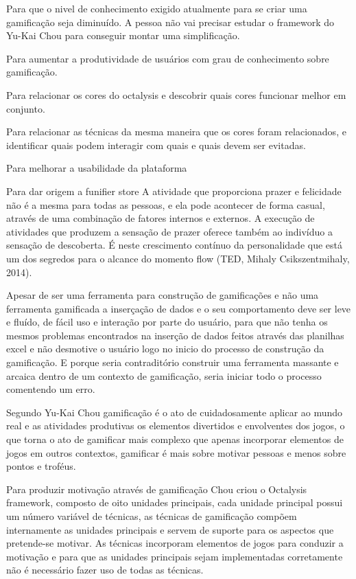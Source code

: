 Para que o nivel de conhecimento exigido atualmente para se criar uma gamificação seja diminuído. A pessoa não vai precisar estudar o framework do Yu-Kai Chou para conseguir montar uma simplificação.

Para aumentar a produtividade de usuários com grau de conhecimento sobre gamificação.

Para relacionar os cores do octalysis e descobrir quais cores funcionar melhor em conjunto.

Para relacionar as técnicas da mesma maneira que os cores foram relacionados, e identificar quais podem interagir com quais e quais devem ser evitadas.

Para melhorar a usabilidade da plataforma

Para dar origem a funifier store 
A atividade que proporciona prazer e felicidade não é a mesma para todas as pessoas, e ela pode acontecer de forma casual, através de uma combinação de fatores internos e externos. A execução de atividades que produzem a sensação de prazer oferece também ao indivíduo a sensação de descoberta. É neste crescimento contínuo da personalidade que está um dos segredos para o alcance do momento flow (TED, Mihaly Csikszentmihaly, 2014).

Apesar de ser uma ferramenta para construção de gamificações e não uma ferramenta gamificada a inserçação de dados e o seu comportamento deve ser leve e fluído, de fácil uso  e interação por parte do usuário, para que não tenha os mesmos problemas encontrados na inserção de dados feitos através das planilhas excel e não desmotive o usuário logo no inicio do processo de construção da gamificação. E porque seria contraditório construir uma ferramenta massante e arcaica dentro de um contexto de gamificação, seria iniciar todo o processo comentendo um erro.


Segundo Yu-Kai Chou \cite{arruda2007} gamificação é o ato de cuidadosamente aplicar ao mundo real e as atividades produtivas os elementos divertidos e envolventes dos jogos, o que torna o ato de gamificar mais complexo que apenas incorporar elementos de jogos em outros contextos, gamificar é mais sobre  motivar pessoas e menos sobre pontos e troféus. 

Para produzir motivação através de gamificação Chou criou o Octalysis framework, composto de oito unidades principais, cada unidade principal possui um número variável de técnicas, as técnicas de gamificação compõem internamente as unidades principais e servem de suporte para os aspectos que pretende-se motivar. As técnicas incorporam elementos de jogos para conduzir a motivação e para que as unidades principais sejam implementadas corretamente não é necessário fazer uso de todas as técnicas.
\newpage

